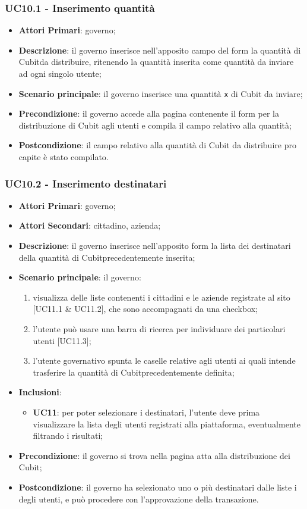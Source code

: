 \subsubsection{UC10.1 - Inserimento quantità}
\begin{itemize}
	\item \textbf{Attori Primari}: governo;
	\item \textbf{Descrizione}: il governo inserisce nell'apposito campo del form la quantità di Cubit\glosp da distribuire, ritenendo la quantità inserita come quantità da inviare ad ogni singolo utente;
	\item \textbf{Scenario principale}: il governo inserisce una quantità \texttt{x} di Cubit da inviare;
	\item \textbf{Precondizione}: il governo accede alla pagina contenente il form per la distribuzione di Cubit agli utenti e compila il campo relativo alla quantità;
	\item \textbf{Postcondizione}: il campo relativo alla quantità di Cubit da distribuire pro capite è stato compilato. 
\end{itemize}
\subsubsection{UC10.2 - Inserimento destinatari}
\begin{itemize}
	\item \textbf{Attori Primari}: governo;
	\item \textbf{Attori Secondari}: cittadino, azienda;
	\item \textbf{Descrizione}: il governo inserisce nell'apposito form la lista dei destinatari della quantità di Cubit\glosp precedentemente inserita;
	\item \textbf{Scenario principale}: il governo:
	\begin{enumerate}[label=\alph*.]
		\item visualizza delle liste contenenti i cittadini e le aziende registrate al sito [UC11.1 \& UC11.2], che sono accompagnati da una checkbox;
		\item l'utente può usare una barra di ricerca per individuare dei particolari utenti [UC11.3];
		\item l'utente governativo spunta le caselle relative agli utenti ai quali intende trasferire la quantità di Cubit\glosp precedentemente definita;
	\end{enumerate}
	\item \textbf{Inclusioni}:
	\begin{itemize}
		\item \textbf{UC11}: per poter selezionare i destinatari, l'utente deve prima visualizzare la lista degli utenti registrati alla piattaforma, eventualmente filtrando i risultati;
	\end{itemize}
	\item \textbf{Precondizione}: il governo si trova nella pagina atta alla distribuzione dei Cubit;
	\item \textbf{Postcondizione}: il governo ha selezionato uno o più destinatari dalle liste i degli utenti, e può procedere con l'approvazione della transazione.
\end{itemize}

